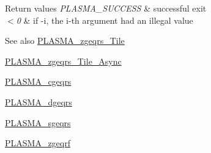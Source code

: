 \begin{DoxyRetVals}{Return values}
{\em P\+L\+A\+S\+M\+A\+\_\+\+S\+U\+C\+C\+E\+S\+S} & successful exit \\
\hline
{\em $<$0} & if -\/i, the i-\/th argument had an illegal value\\
\hline
\end{DoxyRetVals}
\begin{DoxySeeAlso}{See also}
\hyperlink{group__PLASMA__Complex64__t__Tile_gac9063541a51dbee5a3e51ea774d30de9_gac9063541a51dbee5a3e51ea774d30de9}{P\+L\+A\+S\+M\+A\+\_\+zgeqrs\+\_\+\+Tile} 

\hyperlink{group__PLASMA__Complex64__t__Tile__Async_ga2e3360f39f4b262354718a6aaefe649c_ga2e3360f39f4b262354718a6aaefe649c}{P\+L\+A\+S\+M\+A\+\_\+zgeqrs\+\_\+\+Tile\+\_\+\+Async} 

\hyperlink{group__PLASMA__Complex32__t_ga961a4dfc433c5086670b813e5fa53bbf_ga961a4dfc433c5086670b813e5fa53bbf}{P\+L\+A\+S\+M\+A\+\_\+cgeqrs} 

\hyperlink{group__double_gaa133b69ef592ef01466fd93b6ac7689d_gaa133b69ef592ef01466fd93b6ac7689d}{P\+L\+A\+S\+M\+A\+\_\+dgeqrs} 

\hyperlink{group__float_ga15cad3c163c8d1137d13d66594652b7d_ga15cad3c163c8d1137d13d66594652b7d}{P\+L\+A\+S\+M\+A\+\_\+sgeqrs} 

\hyperlink{group__PLASMA__Complex64__t_ga9d4fae8697b364c384faa7480aea3118_ga9d4fae8697b364c384faa7480aea3118}{P\+L\+A\+S\+M\+A\+\_\+zgeqrf} 
\end{DoxySeeAlso}
\hypertarget{group__PLASMA__Complex64__t_ga4550f69e64e28c5b19e82345a4c4fad0_ga4550f69e64e28c5b19e82345a4c4fad0}{}
